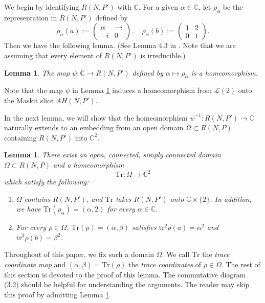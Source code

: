 \documentclass[12pt]{article}
\theoremstyle{plain}
\newtheorem{lem}[thm]{Lemma}
\theoremstyle{definition}
\theoremstyle{remark}
\newcommand{\C}{\mathbb C}
\newcommand{\LL}{\mathcal L}
\newcommand{\alp}{\alpha}
\newcommand{\tr}{{\mathrm{tr}}}
\newcommand{\Tr}{{\mathrm{Tr}}}
\begin{document}
We begin by identifying $R(N,P')$ with $\C$. 
For a given $\alp \in \C$, let $\rho_\alp$ be the representation in $R(N,P')$ defined by 
$$
\rho_\alp(a):=
\left(\begin{array}{cc}
\alp  & -i \\ 
-i & 0
 \end{array}\right), \quad 
 \rho_\alp(b):=
 \left(\begin{array}{cc}
 1 & 2 \\ 
 0& 1
  \end{array}\right). 
$$
Then we have the following lemma.  (See Lemma 4.3 in \cite{Br}. 
Note that we are assuming that every element of $R(N,P')$ is irreducible.)

\begin{lem}\label{trace2}
The map $\psi:\C \to R(N,P')$ defined by $\alp \mapsto \rho_\alp$ is a homeomorphism. 
\end{lem}
%
Note that the map $\psi$ in Lemma \ref{trace2} induces a homeomorphism from $\LL(2)$ onto 
the Maskit slice $AH(N,P')$. 

In the next lemma, we will show that  the homeomorphism $\psi^{-1}:R(N,P') \to \C$ naturally extends to
 an embedding  from an open domain $\Omega \subset R(N,P)$ containing $R(N,P')$ 
into $\C^2$. 

\begin{lem}\label{trace} 
There exist an open,  connected, simply connected domain $\Omega \subset R(N,P)$ 
and a homeomorphism 
$$
{\mathrm{Tr}}:\Omega \to \C^2
$$ 
which satisfy the following: 
\begin{enumerate}
\item 
$\Omega$ contains $R(N,P')$,  
and $\Tr$ takes $R(N,P')$ onto $\C \times \{2\}$. 
In addition, we have  $\Tr(\rho_\alp)=(\alp,2)$ for every $\alp \in \C$. 
\item 
 For every $\rho \in \Omega$, $\Tr(\rho)=(\alp,\beta)$ satisfies  
$\tr^2 \rho(a)=\alp^2$ and $\tr^2 \rho(b)=\beta^2$. 
\end{enumerate}
\end{lem}



Throughout of this paper, we fix such a domain $\Omega$. 
We call $\Tr$ the {\it trace coordinate map} and 
$(\alp,\beta)=\Tr(\rho)$ the {\it trace coordinates} of $\rho \in \Omega$. 
The rest of this section is devoted to the proof of this lemma. 
The commutative diagram (3.2) should be helpful for understanding the arguments. 
The reader may skip this proof by admitting Lemma \ref{trace}. 
\end{document}
